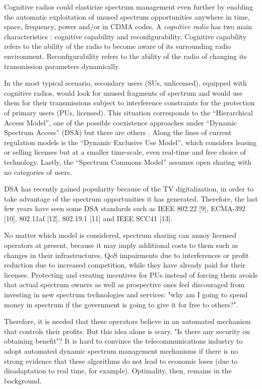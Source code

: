 Cognitive radios \cite{ref:Mitola1999} could elasticize spectrum management even further by enabling the automatic exploitation of unused spectrum opportunities anywhere in time, space, frequency, power and/or in CDMA codes.
A \emph{cognitive radio} has two main characteristics \cite{ref:Akyildiz2006}: cognitive capability and reconfigurability. 
Cognitive capability refers to the ability of the radio to become aware of its surrounding radio environment. Reconfigurability refers to the ability of the radio of changing its transmission parameters dynamically.

In the most typical scenario, secondary users (SUs, unlicensed), equipped with cognitive radios, would look for unused fragments of spectrum and would use them for their transmissions subject to interference constraints for the protection of primary users (PUs, licensed). 
This situation corresponds to the “Hierarchical Access Model”, one of the possible coexistence approaches under “Dynamic Spectrum Access” (DSA) but there are others \cite{ref:Zhao2007}. 
Along the lines of current regulation models is the “Dynamic Exclusive Use Model”, which considers leasing or selling licenses but at a smaller time-scale, even real-time and free choice of technology.
Lastly, the “Spectrum Commons Model”  assumes open sharing with no categories of users.

DSA has recently gained popularity because of the TV digitalization, in order to take advantage of the spectrum opportunities it has generated. %
Therefore, the last few years have seen some DSA standards such as IEEE 802.22 [9], ECMA-392 [10], 802.11af [12], 802.19.1 [11] and IEEE SCC41 [13].

No matter which model is considered, spectrum sharing can annoy licensed operators at present, because it may imply additional costs to them such as changes in their infrastructures, QoS impairments due to interferences or profit reduction due to increased competition, while they have already paid for their licenses. 
Protecting and creating incentives for PUs instead of forcing them avoids that actual spectrum owners as well as prospective ones feel discouraged from investing in new spectrum technologies and services: "why am I going to spend money in spectrum if the government is going to give it for free to others?".

Therefore, it is needed that these operators believe in an automated mechanism that controls their profits. But this idea alone is scary. "Is there any security on obtaining benefit"? It is hard to convince the telecommunications industry to adopt automated dynamic spectrum management mechanisms if there is no strong evidence that these algorithms do not lead to economic loses (due to disadaptation to real time, for example). Optimality, then, remains in the background.

